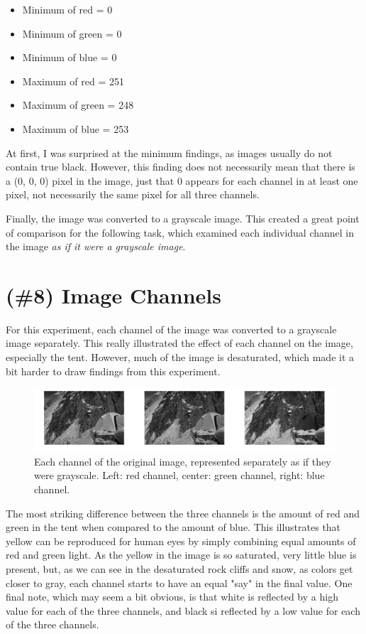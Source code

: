 \documentclass{article}
\begin{document}
\begin{itemize}
    \item Minimum of red = 0
    \item Minimum of green = 0
    \item Minimum of blue = 0
    \item Maximum of red = 251
    \item Maximum of green = 248
    \item Maximum of blue = 253
\end{itemize} 

At first, I was 
surprised at the minimum findings, as images usually do not contain true black. 
However, this finding does not necessarily mean that there is a (0, 0, 0) pixel 
in the image, just that 0 appears for each channel in at least one pixel, not 
necessarily the same pixel for all three channels.

Finally, the image was converted to a grayscale image. This created a great 
point of comparison for the following task, which examined each individual 
channel in the image \textit{as if it were a grayscale image}.

\section{(\#8) Image Channels}

For this experiment, each channel of the image was converted to a grayscale 
image separately. This really illustrated the effect of each channel on the 
image, especially the tent. However, much of the image is desaturated, which 
made it a bit harder to draw findings from this experiment.

\begin{figure}[!ht]
	\centering
	\includegraphics[width=160mm]{figs/tent_channel_comparison.png}
	\caption{Each channel of the original image, represented separately as if 
        they were grayscale. Left: red channel, center: green channel, right: blue 
        channel.}
\end{figure}

The most striking difference between the three channels is the amount of red and 
green in the tent when compared to the amount of blue. This illustrates that 
yellow can be reproduced for human eyes by simply combining equal amounts of 
red and green light. As the yellow in the image is so saturated, very little 
blue is present, but, as we can see in the desaturated rock cliffs and snow, 
as colors get closer to gray, each channel starts to have an equal "say" in the 
final value. One final note, which may seem a bit obvious, is that white is 
reflected by a high value for each of the three channels, and black si reflected 
by a low value for each of the three channels.
\end{document}
